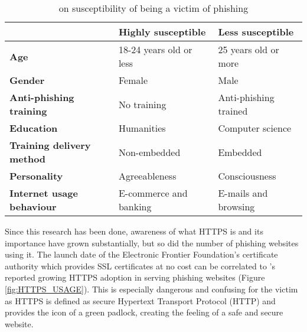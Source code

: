 \begin{table}[b]
	\begin{center}
		\begin{tabular}{  m{12em}  m{12em}  m{11.5em}  } \toprule
			                                  & \textbf{Highly susceptible} & \textbf{Less susceptible} \\ \midrule

			\textbf{Age}                      & 18-24 years old or less     & 25 years old or more      \\

			\textbf{Gender}                   & Female                      & Male                      \\

			\textbf{Anti-phishing training}   & No training                 & Anti-phishing trained     \\

			\textbf{Education}                & Humanities                  & Computer science          \\


			\textbf{Training delivery method} & Non-embedded                & Embedded                  \\

			\textbf{Personality}              & Agreeableness               & Consciousness             \\

			\textbf{Internet usage behaviour} & E-commerce and banking      & E-mails and browsing      \\ \bottomrule
		\end{tabular}

		\caption{\cite{Darwish} on susceptibility of being a victim of phishing}
		\label{tab:SUSCEPTIBILITY_BREAKDOWN}
	\end{center}
\end{table}

Since this research has been done, awareness of what HTTPS is and its importance have grown substantially, but so did the number of phishing websites using it. The launch date of the Electronic Frontier Foundation's \citep{EFF} certificate authority which provides SSL certificates at no cost can be correlated to \cite{APWG_Q42019}'s reported growing HTTPS adoption in serving phishing websites (Figure \ref{fig:HTTPS_USAGE}). This is especially dangerous and confusing for the victim as HTTPS is defined as secure Hypertext Transport Protocol (HTTP) and provides the icon of a green padlock, creating the feeling of a safe and secure website.

